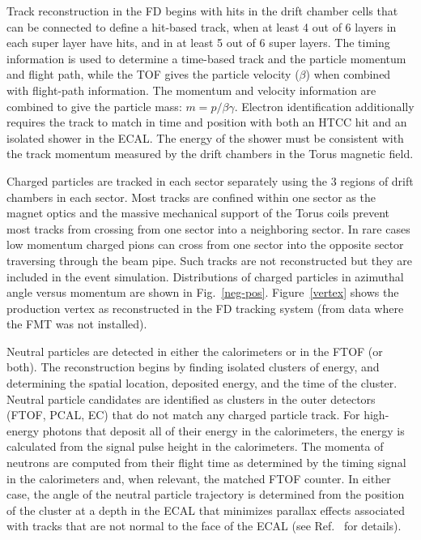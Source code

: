 \documentclass[final,3p,twocolumn]{elsarticle}
\begin{document}
Track reconstruction in the FD begins with hits in the drift chamber cells that can be connected to define a 
hit-based track, when at least 4 out of 6 layers in each super layer have hits, and in at least 5 out of 6 super layers. The
timing information is used to determine a time-based track and the particle momentum and flight path, while the TOF
gives the particle velocity ($\beta$) when combined with flight-path information. The momentum and velocity information
are combined to give the particle mass: $m = p/\beta\gamma$. Electron identification additionally requires the track to
match in time and position with both an HTCC hit and an isolated shower in the ECAL. The energy of the shower must be
consistent with the track momentum measured by the drift chambers in the Torus magnetic field.  

Charged particles are tracked in each sector separately using the 3 regions of drift chambers in each sector. Most
tracks are confined within one sector as the magnet optics and the massive mechanical support of the Torus coils
prevent most tracks from crossing from one sector into a neighboring sector. In rare cases low momentum charged
pions can cross from one sector into the opposite sector traversing through the beam pipe. Such tracks are not
reconstructed but they are included in the event simulation. Distributions of charged particles in azimuthal angle
versus momentum are shown in Fig.~\ref{neg-pos}. Figure~\ref{vertex} shows the production vertex as reconstructed
in the FD tracking system (from data where the FMT was not installed). 

Neutral particles are detected in either the calorimeters or in the FTOF (or both). The reconstruction begins by finding
isolated clusters of energy, and determining the spatial location, deposited energy, and the time of the cluster. Neutral
particle candidates are identified as clusters in the outer detectors (FTOF, PCAL, EC) that do not match any charged
particle track. For high-energy photons that deposit all of their energy in the calorimeters, the energy is calculated from
the signal pulse height in the calorimeters. The momenta of neutrons are computed from their flight time as determined
by the timing signal in the calorimeters and, when relevant, the matched FTOF counter. In either case, the angle of the
neutral particle trajectory is determined from the position of the cluster at a depth in the ECAL that minimizes
parallax effects associated with tracks that are not normal to the face of the ECAL (see Ref.~\cite{ECAL} for
details).
\end{document}

